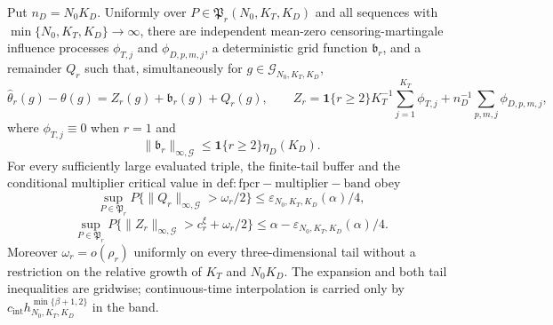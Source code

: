 Put \(n_D=N_0K_D\). Uniformly over \(P\in\mathfrak P_r(N_0,K_T,K_D)\) and all sequences with \(\min\{N_0,K_T,K_D\}\to\infty\), there are independent mean-zero censoring-martingale influence processes \(\phi_{T,j}\) and \(\phi_{D,p,m,j}\), a deterministic grid function \(\mathfrak b_r\), and a remainder \(Q_r\) such that, simultaneously for \(g\in\mathcal G_{N_0,K_T,K_D}\),
\[
 \widehat\theta_r(g)-\theta(g)=Z_r(g)+\mathfrak b_r(g)+Q_r(g),
 \qquad
 Z_r=\mathbf 1\{r\ge2\}K_T^{-1}\sum_{j=1}^{K_T}\phi_{T,j}
     +n_D^{-1}\sum_{p,m,j}\phi_{D,p,m,j},
\]
where \(\phi_{T,j}\equiv0\) when \(r=1\) and
\[
 \|\mathfrak b_r\|_{\infty,\mathcal G}
 \le \mathbf 1\{r\ge2\}\eta_D(K_D).
\]
For every sufficiently large evaluated triple, the finite-tail buffer and the conditional multiplier critical value in \(\mathrm{def:fpcr-multiplier-band}\) obey
\[
 \sup_{P\in\mathfrak P_r}P\{\|Q_r\|_{\infty,\mathcal G}>\omega_r/2\}
 \le\varepsilon_{N_0,K_T,K_D}(\alpha)/4,
\]
\[
 \sup_{P\in\mathfrak P_r}P\{\|Z_r\|_{\infty,\mathcal G}>c_r^\xi+\omega_r/2\}
 \le\alpha-\varepsilon_{N_0,K_T,K_D}(\alpha)/4.
\]
Moreover \(\omega_r=o(\rho_r)\) uniformly on every three-dimensional tail without a restriction on the relative growth of \(K_T\) and \(N_0K_D\). The expansion and both tail inequalities are gridwise; continuous-time interpolation is carried only by \(c_{\mathrm{int}}h_{N_0,K_T,K_D}^{\min\{\beta+1,2\}}\) in the band.